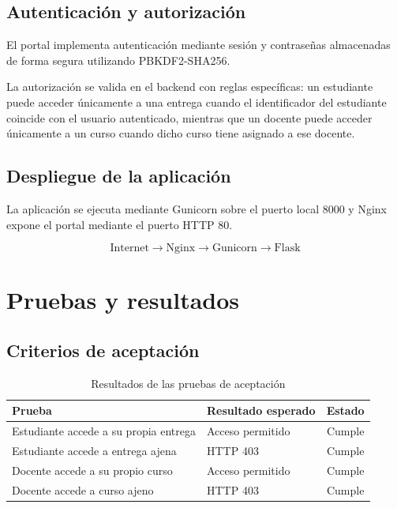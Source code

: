 \documentclass[11pt,letterpaper]{article}
\begin{document}
\subsection{Autenticación y autorización}

El portal implementa autenticación mediante sesión y contraseñas almacenadas de forma segura utilizando PBKDF2-SHA256.

La autorización se valida en el backend con reglas específicas: un estudiante puede acceder únicamente a una entrega cuando el identificador del estudiante coincide con el usuario autenticado, mientras que un docente puede acceder únicamente a un curso cuando dicho curso tiene asignado a ese docente.

\subsection{Despliegue de la aplicación}

La aplicación se ejecuta mediante Gunicorn sobre el puerto local 8000 y Nginx expone el portal mediante el puerto HTTP 80.

\[
\text{Internet} \rightarrow \text{Nginx} \rightarrow \text{Gunicorn} \rightarrow \text{Flask}
\]

\section{Pruebas y resultados}

\subsection{Criterios de aceptación}

\begin{table}[H]
\centering
\caption{Resultados de las pruebas de aceptación}
\label{tab:pruebas}
\begin{tabularx}{\textwidth}{X X c}
\toprule
Prueba & Resultado esperado & Estado \\
\midrule
Estudiante accede a su propia entrega & Acceso permitido & Cumple \\
Estudiante accede a entrega ajena & HTTP 403 & Cumple \\
Docente accede a su propio curso & Acceso permitido & Cumple \\
Docente accede a curso ajeno & HTTP 403 & Cumple \\
\bottomrule
\end{tabularx}
\end{table}
\end{document}
